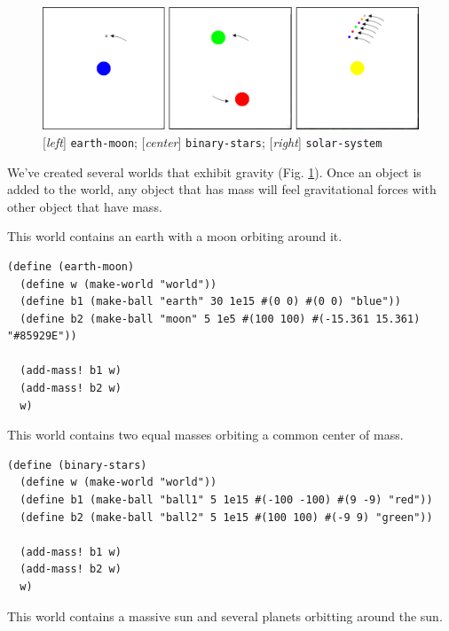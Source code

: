 \documentclass{article}
\begin{document}
\begin{figure}[h!]
  \centering
 \includegraphics[width=\textwidth,height=\textheight,keepaspectratio]{figs/gravity.png}
  \caption{[\textit{left}] \texttt{earth-moon}; [\textit{center}] \texttt{binary-stars}; [\textit{right}] \texttt{solar-system}}
  \label{figure:gravity}
\end{figure}

We've created several worlds that exhibit gravity (Fig. \ref{figure:gravity}).
Once an object is added to the world, any object that has mass will feel
gravitational forces with other object that have mass.

This world contains an earth with a moon orbiting around it.
{\small\begin{verbatim}
(define (earth-moon)
  (define w (make-world "world"))
  (define b1 (make-ball "earth" 30 1e15 #(0 0) #(0 0) "blue"))
  (define b2 (make-ball "moon" 5 1e5 #(100 100) #(-15.361 15.361) "#85929E"))

  (add-mass! b1 w)
  (add-mass! b2 w)
  w)
\end{verbatim}}


This world contains two equal masses orbiting a common center of mass.

{\small\begin{verbatim}
(define (binary-stars)
  (define w (make-world "world"))
  (define b1 (make-ball "ball1" 5 1e15 #(-100 -100) #(9 -9) "red"))
  (define b2 (make-ball "ball2" 5 1e15 #(100 100) #(-9 9) "green"))

  (add-mass! b1 w)
  (add-mass! b2 w)
  w)
\end{verbatim}}


This world contains a massive sun and several planets orbitting around the sun.
\end{document}
